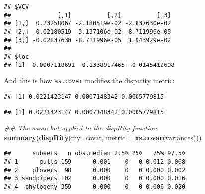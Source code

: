\documentclass[
]{book}
\newenvironment{Shaded}{\begin{snugshade}}{\end{snugshade}}
\newcommand{\CommentTok}[1]{\textcolor[rgb]{0.56,0.35,0.01}{\textit{#1}}}
\newcommand{\DataTypeTok}[1]{\textcolor[rgb]{0.13,0.29,0.53}{#1}}
\newcommand{\DecValTok}[1]{\textcolor[rgb]{0.00,0.00,0.81}{#1}}
\newcommand{\KeywordTok}[1]{\textcolor[rgb]{0.13,0.29,0.53}{\textbf{#1}}}
\newcommand{\NormalTok}[1]{#1}
\newcommand{\OperatorTok}[1]{\textcolor[rgb]{0.81,0.36,0.00}{\textbf{#1}}}
\newcommand{\StringTok}[1]{\textcolor[rgb]{0.31,0.60,0.02}{#1}}
\begin{document}
\begin{verbatim}
## $VCV
##             [,1]          [,2]          [,3]
## [1,]  0.23258067 -2.180519e-02 -2.837630e-02
## [2,] -0.02180519  3.137106e-02 -8.711996e-05
## [3,] -0.02837630 -8.711996e-05  1.943929e-02
## 
## $loc
## [1]  0.0007118691  0.1338917465 -0.0145412698
\end{verbatim}

And this is how \texttt{as.covar} modifies the disparity metric:

\begin{Shaded}
\end{Shaded}

\begin{verbatim}
## [1] 0.0221423147 0.0007148342 0.0005779815
\end{verbatim}

\begin{Shaded}
\end{Shaded}

\begin{verbatim}
## [1] 0.0221423147 0.0007148342 0.0005779815
\end{verbatim}

\begin{Shaded}
\begin{Highlighting}[]
\CommentTok{\#\# The same but applied to the dispRity function}
\KeywordTok{summary}\NormalTok{(}\KeywordTok{dispRity}\NormalTok{(my\_covar, }\DataTypeTok{metric =} \KeywordTok{as.covar}\NormalTok{(variances)))}
\end{Highlighting}
\end{Shaded}

\begin{verbatim}
##      subsets   n obs.median 2.5% 25%   75% 97.5%
## 1      gulls 159      0.001    0   0 0.012 0.068
## 2    plovers  98      0.000    0   0 0.000 0.002
## 3 sandpipers 102      0.000    0   0 0.000 0.016
## 4  phylogeny 359      0.000    0   0 0.006 0.020
\end{verbatim}
\end{document}
